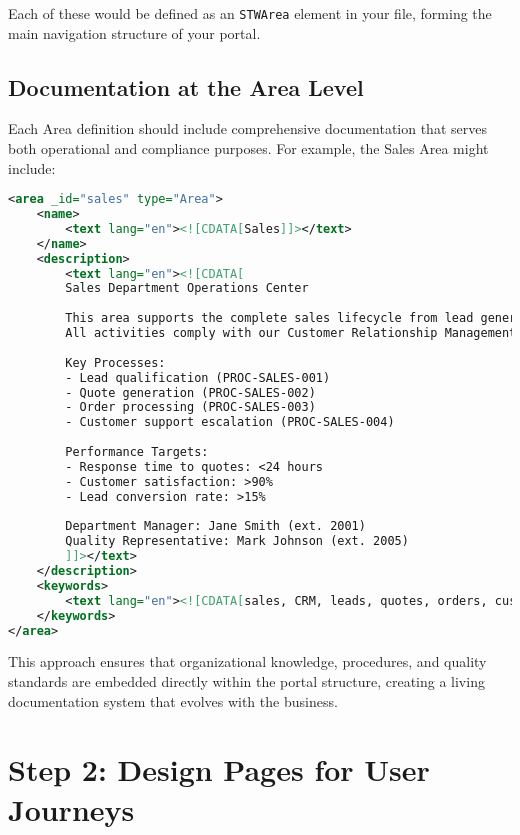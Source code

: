 Each of these would be defined as an \texttt{STWArea} element in your \wbdl{} file, forming the main navigation structure of your portal.

\subsection{Documentation at the Area Level}
\label{sec:area-documentation}

Each Area definition should include comprehensive documentation that serves both operational and compliance purposes. For example, the Sales Area might include:

\begin{lstlisting}[language=XML,caption={Sales Area with Documentation},label={lst:sales-area-docs}]
<area _id="sales" type="Area">
    <name>
        <text lang="en"><![CDATA[Sales]]></text>
    </name>
    <description>
        <text lang="en"><![CDATA[
        Sales Department Operations Center
        
        This area supports the complete sales lifecycle from lead generation to order fulfillment.
        All activities comply with our Customer Relationship Management Policy CRM-POL-001.
        
        Key Processes:
        - Lead qualification (PROC-SALES-001)
        - Quote generation (PROC-SALES-002)
        - Order processing (PROC-SALES-003)
        - Customer support escalation (PROC-SALES-004)
        
        Performance Targets: 
        - Response time to quotes: <24 hours
        - Customer satisfaction: >90%
        - Lead conversion rate: >15%
        
        Department Manager: Jane Smith (ext. 2001)
        Quality Representative: Mark Johnson (ext. 2005)
        ]]></text>
    </description>
    <keywords>
        <text lang="en"><![CDATA[sales, CRM, leads, quotes, orders, customer service, KPI, performance targets]]></text>
    </keywords>
</area>
\end{lstlisting}

This approach ensures that organizational knowledge, procedures, and quality standards are embedded directly within the portal structure, creating a living documentation system that evolves with the business.

\section{Step 2: Design Pages for User Journeys}
\label{sec:design-pages}

